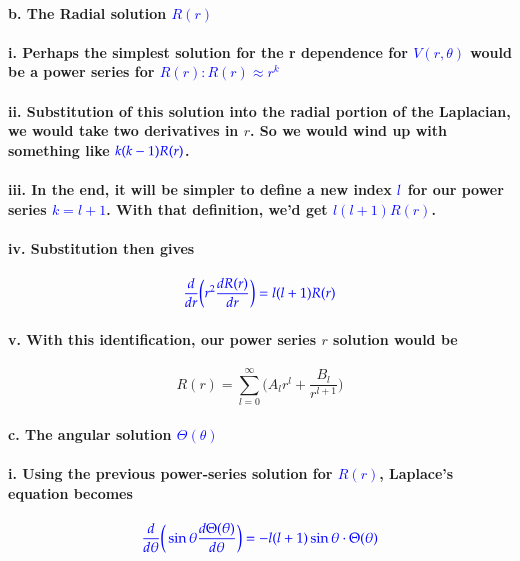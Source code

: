 \documentclass{article}
\begin{document}
\paragraph{\indent b. The Radial solution \textcolor{blue}{$R(r)$}}
\paragraph{\indent\indent i. Perhaps the simplest solution for the r dependence for \textcolor{blue}{$V(r,\theta)$} would be a power series for \textcolor{blue}{$R(r):R(r)\approx r^k$}}
\paragraph{\indent\indent ii. Substitution of this solution into the radial portion of the Laplacian, we would take two derivatives in $r$. So we would wind up with something like $\textcolor{blue}{k(k-1)R(r)}$.}
\paragraph{\indent\indent iii. In the end, it will be simpler to define a new index $\textcolor{blue}{l}$ for our power series \textcolor{blue}{$k=l+1$}. With that definition, we'd get \textcolor{blue}{$l(l+1)R(r)$}.}
\paragraph{\indent\indent iv. Substitution then gives}
\begin{equation*}
    \textcolor{blue}{\frac{d}{dr}\bigg(r^2\frac{dR(r)}{dr}\bigg)=l(l+1)R(r)}
\end{equation*}
\paragraph{\indent\indent v. With this identification, our power series $r$ solution would be}
\begin{equation*}
    R(r)=\sum_{l=0}^{\infty}\bigg(A_lr^l+\frac{B_l}{r^{l+1}}\bigg)
\end{equation*}
\paragraph{\indent c. The angular solution \textcolor{blue}{$\Theta(\theta)$}}
\paragraph{\indent\indent i. Using the previous power-series solution for \textcolor{blue}{$R(r)$}, Laplace's equation becomes}
\begin{equation*}
    \textcolor{blue}{\frac{d}{d\theta}\bigg(\sin\theta\frac{d\Theta(\theta)}{d\theta}\bigg)=-l(l+1)\sin\theta\cdot\Theta(\theta)}
\end{equation*}
\end{document}
